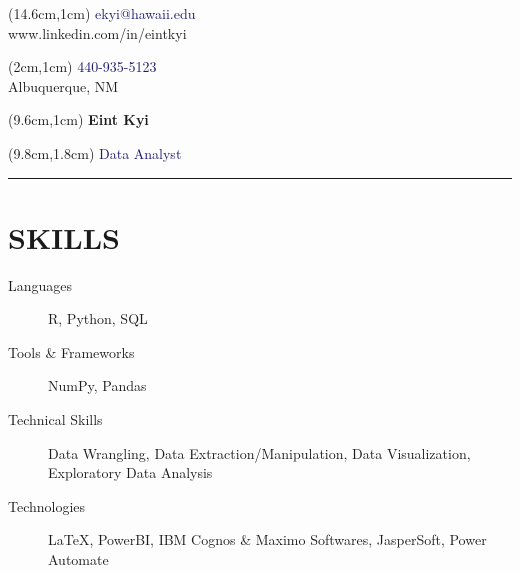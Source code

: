 \documentclass[letterpaper,11pt]{article}
\begin{document}
\begin{textblock*}{5cm}(14.6cm,1cm) %
\raggedleft\textcolor{MidnightBlue}{ekyi@hawaii.edu}\\
www.linkedin.com/in/eintkyi
\end{textblock*}
\raggedright
\begin{textblock*}{5cm}(2cm,1cm) %
\textcolor{MidnightBlue}{440-935-5123}\\
   Albuquerque, NM
\end{textblock*}
\begin{textblock*}{10cm}(9.6cm,1cm) %
\huge
\textbf{Eint Kyi}\\

\end{textblock*}
\begin{textblock*}{20cm}(9.8cm,1.8cm) %
\large
\textcolor{MidnightBlue}{Data Analyst}
\end{textblock*}
\noindent
{\color{MidnightBlue} \rule{\linewidth}{0.7mm} }
\vspace{-0.6cm}


\section{SKILLS}
\begin{description}
\item[Languages]
R, Python, SQL
\vspace{-0.3cm}
\item[Tools \& Frameworks] 
NumPy, Pandas
\vspace{-0.3cm}
\item[Technical Skills] Data Wrangling, Data Extraction/Manipulation, Data Visualization, Exploratory Data Analysis
\vspace{-0.3cm}
\item[Technologies]  LaTeX, PowerBI, IBM Cognos \& Maximo Softwares, JasperSoft, Power Automate
\vspace{-0.15cm}
\end{description}
\end{document}
